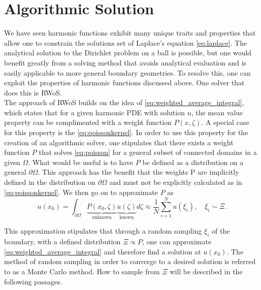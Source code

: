 \section{Algorithmic Solution}
We have seen harmonic functions exhibit many unique traits and properties
that allow one to constrain the solutions set of Laplace's equation \eqref{eq:laplace}.
 The analytical solution to the Dirichlet problem on a ball is possible, but one would benefit greatly
from a solving method that avoids analytical evaluation and is easily applicable to more
general boundary geometries.  To resolve this, one can exploit the properties
of harmonic functions discussed above.  One solver that does this is \Gls{RWoS}.\\
The approach of \gls{RWoS} builds on the idea of \eqref{eq:weighted_average_integral},
which states that for a given harmonic \gls{PDE} with solution $u$, the mean value
property can be complimented with a weight function $P(x,\zeta)$.  A special case
for this property is the \eqref{eq:poissonkernel}.    In order to
use this property for the creation of an algorithmic solver, one stipulates
that there exists a weight function $P$ that solves \eqref{eq:poisson} for a general subset of connected domains
in a given $\Omega.$ What would be useful is to have $P$ be defined as a distribution
on a general $\partial \Omega$.  This approach has the benefit that the weights P are
implicitly defined in the distribution on $\partial \Omega$ and must not be
explicitly calculated as in \eqref{eq:poissonkernel}. We then go on to approximate $P$ as
\begin{equation}
  u(x_{0})= \int_{\partial \Omega} \underbrace{P(x_{0},\zeta)}_\text{unknown}
   \underbrace{u(\zeta)}_\text{known} d\zeta \approx \frac{1}{N} \sum_{i=1}^{N} u(\xi_{i}),
   \quad \xi_{i} \sim \Xi.
\end{equation}

This approximation stipulates that through a random sampling $\xi_{i}$ of the boundary, with
a defined distribution $\Xi \propto P$, one can approximate \eqref{eq:weighted_average_integral} and therefore
find a solution at $u(x_{0})$.  The method of random sampling in order to converge to a desired solution
is referred to as a Monte Carlo method.  How to sample from $\Xi$ will be described in the following passages.
\par

